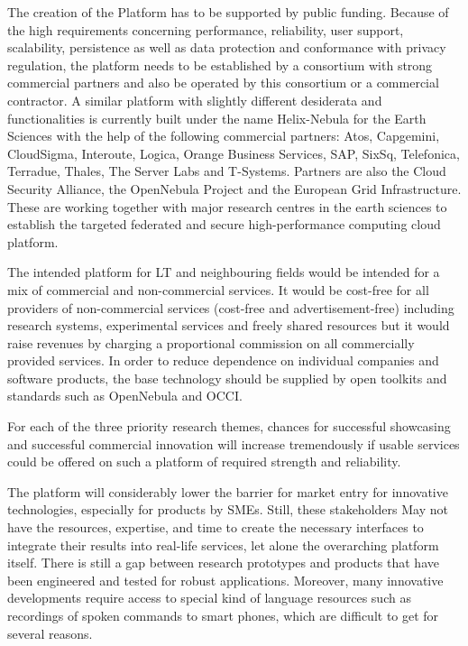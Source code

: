 \documentclass[10pt, plain]{../../metanetpaper}
\begin{document}
\begin{multicols}{2}
The creation of the Platform has to be supported by public funding. Because of the high requirements concerning performance, reliability, user support, scalability, persistence as well as data protection and conformance with privacy regulation, the platform needs to be established by a consortium with strong commercial partners and also be operated by this consortium or a commercial contractor. A similar platform with slightly different desiderata and functionalities is currently built under the name Helix-Nebula for the Earth Sciences with the help of the following commercial partners: Atos, Capgemini, CloudSigma, Interoute, Logica, Orange Business Services, SAP, SixSq, Telefonica, Terradue, Thales, The Server Labs and T-Systems. Partners are also the Cloud Security Alliance, the OpenNebula Project and the European Grid Infrastructure. These are working together with major research centres in the earth sciences to establish the targeted federated and secure high-performance computing cloud platform.
 
The intended platform for LT and neighbouring fields would be intended for a mix of commercial and non-commercial services. It would be cost-free for all providers of non-commercial services (cost-free and advertisement-free) including research systems, experimental services and freely shared resources but it would raise revenues by charging a proportional commission on all commercially provided services.  In order to reduce dependence on individual companies and software products, the base technology should be supplied by open toolkits and standards such as OpenNebula and OCCI.  
 
For each of the three priority research themes, chances for successful showcasing and successful commercial innovation will increase tremendously if usable services could be offered on such a platform of required strength and reliability.
 
The platform will considerably lower the barrier for market entry for innovative technologies, especially for products by SMEs. Still, these stakeholders May not have the resources, expertise, and time to create the necessary interfaces to integrate their results into real-life services, let alone the overarching platform itself. There is still a gap between research prototypes and products that have been engineered and tested for robust applications. Moreover, many innovative developments require access to special kind of language resources such as recordings of spoken commands to smart phones, which are difficult to get for several reasons.
 

\end{multicols}
\end{document}
